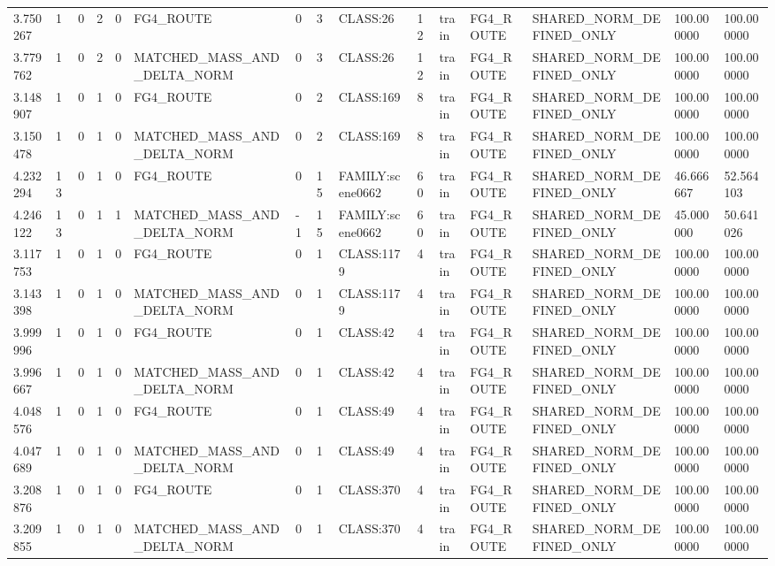 \begin{tabular}{lllllllllllllll}
3.750267 & 1 & 0 & 2 & 0 & FG4\_ROUTE & 0 & 3 & CLASS:26 & 12 & train & FG4\_ROUTE & SHARED\_NORM\_DEFINED\_ONLY & 100.000000 & 100.000000 \\
3.779762 & 1 & 0 & 2 & 0 & MATCHED\_MASS\_AND\_DELTA\_NORM & 0 & 3 & CLASS:26 & 12 & train & FG4\_ROUTE & SHARED\_NORM\_DEFINED\_ONLY & 100.000000 & 100.000000 \\
3.148907 & 1 & 0 & 1 & 0 & FG4\_ROUTE & 0 & 2 & CLASS:169 & 8 & train & FG4\_ROUTE & SHARED\_NORM\_DEFINED\_ONLY & 100.000000 & 100.000000 \\
3.150478 & 1 & 0 & 1 & 0 & MATCHED\_MASS\_AND\_DELTA\_NORM & 0 & 2 & CLASS:169 & 8 & train & FG4\_ROUTE & SHARED\_NORM\_DEFINED\_ONLY & 100.000000 & 100.000000 \\
4.232294 & 13 & 0 & 1 & 0 & FG4\_ROUTE & 0 & 15 & FAMILY:scene0662 & 60 & train & FG4\_ROUTE & SHARED\_NORM\_DEFINED\_ONLY & 46.666667 & 52.564103 \\
4.246122 & 13 & 0 & 1 & 1 & MATCHED\_MASS\_AND\_DELTA\_NORM & -1 & 15 & FAMILY:scene0662 & 60 & train & FG4\_ROUTE & SHARED\_NORM\_DEFINED\_ONLY & 45.000000 & 50.641026 \\
3.117753 & 1 & 0 & 1 & 0 & FG4\_ROUTE & 0 & 1 & CLASS:1179 & 4 & train & FG4\_ROUTE & SHARED\_NORM\_DEFINED\_ONLY & 100.000000 & 100.000000 \\
3.143398 & 1 & 0 & 1 & 0 & MATCHED\_MASS\_AND\_DELTA\_NORM & 0 & 1 & CLASS:1179 & 4 & train & FG4\_ROUTE & SHARED\_NORM\_DEFINED\_ONLY & 100.000000 & 100.000000 \\
3.999996 & 1 & 0 & 1 & 0 & FG4\_ROUTE & 0 & 1 & CLASS:42 & 4 & train & FG4\_ROUTE & SHARED\_NORM\_DEFINED\_ONLY & 100.000000 & 100.000000 \\
3.996667 & 1 & 0 & 1 & 0 & MATCHED\_MASS\_AND\_DELTA\_NORM & 0 & 1 & CLASS:42 & 4 & train & FG4\_ROUTE & SHARED\_NORM\_DEFINED\_ONLY & 100.000000 & 100.000000 \\
4.048576 & 1 & 0 & 1 & 0 & FG4\_ROUTE & 0 & 1 & CLASS:49 & 4 & train & FG4\_ROUTE & SHARED\_NORM\_DEFINED\_ONLY & 100.000000 & 100.000000 \\
4.047689 & 1 & 0 & 1 & 0 & MATCHED\_MASS\_AND\_DELTA\_NORM & 0 & 1 & CLASS:49 & 4 & train & FG4\_ROUTE & SHARED\_NORM\_DEFINED\_ONLY & 100.000000 & 100.000000 \\
3.208876 & 1 & 0 & 1 & 0 & FG4\_ROUTE & 0 & 1 & CLASS:370 & 4 & train & FG4\_ROUTE & SHARED\_NORM\_DEFINED\_ONLY & 100.000000 & 100.000000 \\
3.209855 & 1 & 0 & 1 & 0 & MATCHED\_MASS\_AND\_DELTA\_NORM & 0 & 1 & CLASS:370 & 4 & train & FG4\_ROUTE & SHARED\_NORM\_DEFINED\_ONLY & 100.000000 & 100.000000 \\

\end{tabular}
